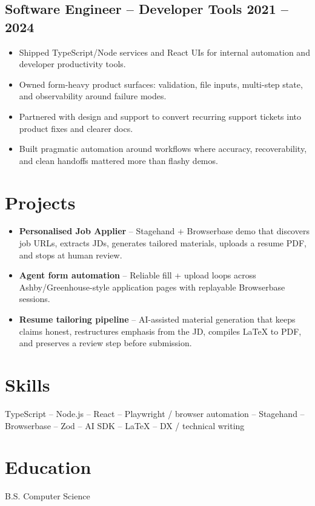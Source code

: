 \documentclass[10pt]{article}
\begin{document}
\subsection*{Software Engineer -- Developer Tools \hfill 2021 -- 2024}
\begin{itemize}
\item Shipped TypeScript/Node services and React UIs for internal automation and developer productivity tools.
\item Owned form-heavy product surfaces: validation, file inputs, multi-step state, and observability around failure modes.
\item Partnered with design and support to convert recurring support tickets into product fixes and clearer docs.
\item Built pragmatic automation around workflows where accuracy, recoverability, and clean handoffs mattered more than flashy demos.
\end{itemize}

\section*{Projects}
\begin{itemize}
\item \textbf{Personalised Job Applier} -- Stagehand + Browserbase demo that discovers job URLs, extracts JDs, generates tailored materials, uploads a resume PDF, and stops at human review.
\item \textbf{Agent form automation} -- Reliable fill + upload loops across Ashby/Greenhouse-style application pages with replayable Browserbase sessions.
\item \textbf{Resume tailoring pipeline} -- AI-assisted material generation that keeps claims honest, restructures emphasis from the JD, compiles LaTeX to PDF, and preserves a review step before submission.
\end{itemize}

\section*{Skills}
TypeScript -- Node.js -- React -- Playwright / browser automation -- Stagehand -- Browserbase -- Zod -- AI SDK -- LaTeX -- DX / technical writing

\section*{Education}
B.S. Computer Science
\end{document}

